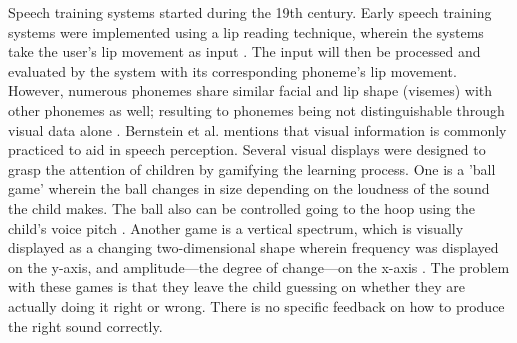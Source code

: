 \begin{comment}
Throughout the years, man has tried to find ways to help the hearing-impaired learn how to speak properly \cite{oyer:1976:CHH}. Oyer \citeyear{oyer:1976:CHH} states that there was a time when hearing-impared were considered unfit to hold citizenship. James Pickett, a professor of speech communication research says "I believe that large improvements in the lives of deaf persons depends on making large improvements in their speech communication" \cite{connor:1971:SDC}. Pickett also states that in the late 19th century, research began for helping the Deaf communicate \cite{connor:1971:SDC}.

One problem of a hearing-impaired student is the lack of access to speech training aids outside of therapy \cite{bernstein:1988:STA}. Extensive practice is required for the student to progress \cite{bernstein:1988:STA}.
\end{comment}

Speech training systems started during the 19th century. Early speech training systems were implemented using a lip reading technique, wherein the systems take the user's lip movement as input \cite{heracleous:2010:CSA}. The input will then be processed and evaluated by the system with its corresponding phoneme's lip movement. However, numerous phonemes share similar facial and lip shape (visemes) with other phonemes as well; resulting to phonemes being not distinguishable through visual data alone \cite{heracleous:2010:CSA}.
Bernstein et al. \citeyear{bernstein:1988:STA} mentions that visual information is commonly practiced to aid in speech perception. Several visual displays were designed to grasp the attention of children by gamifying the learning process. One is a 'ball game' wherein the ball changes in size depending on the loudness of the sound the child makes. The ball also can be controlled going to the hoop using the child's voice pitch \cite{bernstein:1988:STA}. Another game is a vertical spectrum, which is visually displayed as a changing two-dimensional shape wherein frequency was displayed on the y-axis, and amplitude---the degree of change---on the x-axis \cite{bernstein:1988:STA}. The problem with these games is that they leave the child guessing on whether they are actually doing it right or wrong. There is no specific feedback on how to produce the right sound correctly.

